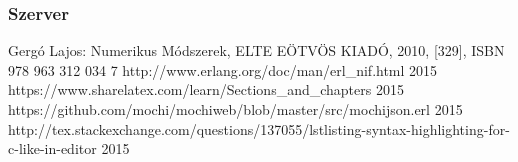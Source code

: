 \documentclass{elteikthesis}
\begin{document}
\subsubsection{Szerver}




\begin{thebibliography}{9}
Gergó Lajos: Numerikus Módszerek, ELTE EÖTVÖS KIADÓ, 2010, [329], ISBN 978 963 312 034 7
\bibitem{} {http://www.erlang.org/doc/man/erl\_nif.html} 2015
\bibitem{} {https://www.sharelatex.com/learn/Sections\_and\_chapters} 
2015
\bibitem{} {https://github.com/mochi/mochiweb/blob/master/src/mochijson.erl} 2015
\bibitem{} {http://tex.stackexchange.com/questions/137055/lstlisting-syntax-highlighting-for-c-like-in-editor} 2015
\end{thebibliography}
\end{document}
